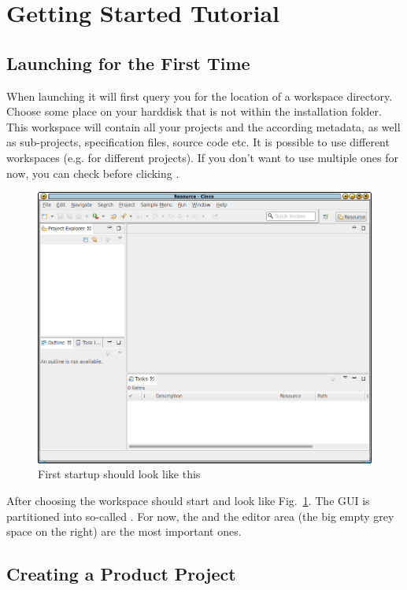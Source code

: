 \documentclass[a4paper,american,12pt]{scrreprt}
\begin{document}
\section{Getting Started Tutorial}

\subsection{Launching \cinco for the First Time}

When launching \cinco{} it will first query you for the location of a workspace
directory. Choose some place on your harddisk that is not within the \cinco
installation folder. This workspace will contain all your \cinco projects
and the according metadata, as well as sub-projects, specification files, source
code etc. It is possible to use different workspaces (e.g. for different
projects). If you don't want to use multiple ones for now, you can check
 before clicking .

\begin{figure}
	\centering
	\includegraphics[width=.7\textwidth]{screenshots/cinco-gui-firststart.png} 
	\caption{First startup should look like this}
	\label{fig:firstStart}
\end{figure}

After choosing the workspace \cinco should start and look like
Fig.~\ref{fig:firstStart}. The GUI is partitioned into so-called
. For now, the  and the editor area (the
big empty grey space on the right) are the most important ones. 

\subsection{Creating a \cinco Product Project}
\end{document}
